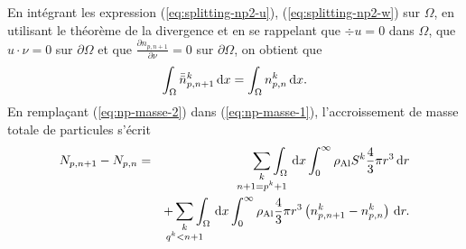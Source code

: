 En intégrant les expression (\ref{eq:splitting-np2-u}),
(\ref{eq:splitting-np2-w}) sur $\Omega$, en utilisant le théorème
de la divergence et en se rappelant que $\div u = 0$ dans $\Omega$,
que $u\cdot\nu = 0$ sur $\partial \Omega$ et que $\frac{\partial
  n_{p,n+1}}{\partial \nu} = 0$ sur $\partial \Omega$, on obtient que
\begin{equation}\label{eq:np-masse-2}
  \int_\Omega \bar{\bar n}_{p,n+1}^k\,\mathrm dx = \int_\Omega n_{p,n}^k\,\mathrm dx.
\end{equation}
En remplaçant (\ref{eq:np-masse-2}) dans (\ref{eq:np-masse-1}),
l'accroissement de masse totale de particules s'écrit
\begin{eqnarray}\label{eq:np-masse-3}
  N_{p,n+1} - N_{p,n} &=&\sum_{\mathclap{\substack{k\\ n+1 = p^k+1}}} \displaystyle\int_\Omega\intd{x}\displaystyle\int_0^\infty \aluminadensity S^k\frac{4}{3}\pi
  r^3\intd{r} \nonumber\\
  && + \sum_{\mathclap{\substack{k \\ q^k < n+1}}} \displaystyle\int_\Omega\intd{x}\displaystyle\int_0^\infty \aluminadensity \frac{4}{3}\pi
    r^3\parent{n_{p,n+1}^k - n_{p,n}^k}\intd{r}.
\end{eqnarray}


